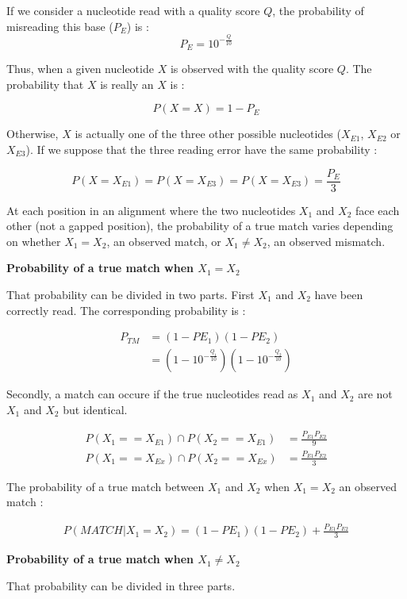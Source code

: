 \documentclass[
  letterpaper,
  DIV=11,
  numbers=noendperiod]{scrreprt}
\begin{document}
If we consider a nucleotide read with a quality score \(Q\), the
probability of misreading this base (\(P_E\)) is : \[
P_E = 10^{-\frac{Q}{10}}
\]

Thus, when a given nucleotide \(X\) is observed with the quality score
\(Q\). The probability that \(X\) is really an \(X\) is :

\[
P(X=X) = 1 - P_E
\]

Otherwise, \(X\) is actually one of the three other possible nucleotides
(\(X_{E1}\), \(X_{E2}\) or \(X_{E3}\)). If we suppose that the three
reading error have the same probability :

\[
P(X=X_{E1}) = P(X=X_{E3}) = P(X=X_{E3}) = \frac{P_E}{3}
\]

At each position in an alignment where the two nucleotides \(X_1\) and
\(X_2\) face each other (not a gapped position), the probability of a
true match varies depending on whether \(X_1=X_2\), an observed match,
or \(X_1 \neq X_2\), an observed mismatch.

\textbf{Probability of a true match when \(X_1=X_2\)}

That probability can be divided in two parts. First \(X_1\) and \(X_2\)
have been correctly read. The corresponding probability is :

\[
\begin{aligned}
P_{TM} &= (1- PE_1)(1-PE_2)\\ 
       &=(1 - 10^{-\frac{Q_1}{10} } )(1 - 10^{-\frac{Q_2}{10}} )
\end{aligned}
\]

Secondly, a match can occure if the true nucleotides read as \(X_1\) and
\(X_2\) are not \(X_1\) and \(X_2\) but identical.

\[
\begin{aligned}
P(X_1==X_{E1}) \cap P(X_2==X_{E1}) &= \frac{P_{E1} P_{E2}}{9} \\
P(X_1==X_{Ex}) \cap P(X_2==X_{Ex}) & = \frac{P_{E1} P_{E2}}{3}
\end{aligned}
\]

The probability of a true match between \(X_1\) and \(X_2\) when
\(X_1 = X_2\) an observed match :

\[
\begin{aligned}
P(MATCH | X_1 = X_2) = (1- PE_1)(1-PE_2) + \frac{P_{E1} P_{E2}}{3}
\end{aligned}
\]

\textbf{Probability of a true match when \(X_1 \neq X_2\)}

That probability can be divided in three parts.
\end{document}
